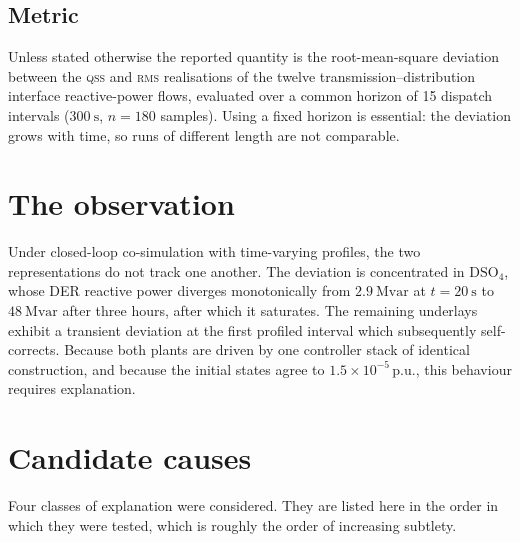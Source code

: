 \documentclass[11pt,a4paper]{article}
\newcommand{\pu}{\ensuremath{\mathrm{p.u.}}}
\newcommand{\Mvar}{\ensuremath{\mathrm{Mvar}}}
\newcommand{\qss}{\textsc{qss}}
\newcommand{\rms}{\textsc{rms}}
\begin{document}
\subsection{Metric}

Unless stated otherwise the reported quantity is the root-mean-square
deviation between the \qss{} and \rms{} realisations of the twelve
transmission--distribution interface reactive-power flows, evaluated over a
common horizon of 15 dispatch intervals ($\SI{300}{\second}$, $n = 180$
samples). Using a fixed horizon is essential: the deviation grows with time,
so runs of different length are not comparable.

\section{The observation}

Under closed-loop co-simulation with time-varying profiles, the two
representations do not track one another. The deviation is concentrated in
$\mathrm{DSO}_4$, whose DER reactive power diverges monotonically from
$\SI{2.9}{\Mvar}$ at $t=\SI{20}{\second}$ to $\SI{48}{\Mvar}$ after three
hours, after which it saturates. The remaining underlays exhibit a
transient deviation at the first profiled interval which subsequently
self-corrects. Because both plants are driven by one controller stack of
identical construction, and because the initial states agree to
$1.5\times10^{-5}\,\pu$, this behaviour requires explanation.

\section{Candidate causes}

Four classes of explanation were considered. They are listed here in the
order in which they were tested, which is roughly the order of increasing
subtlety.
\end{document}
